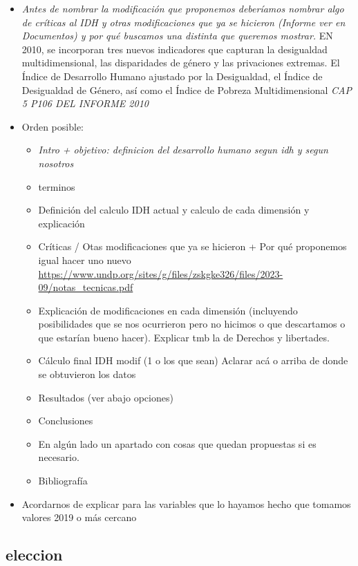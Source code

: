 \documentclass[
  10pt,
]{article}
\providecommand{\tightlist}{%
  \setlength{\itemsep}{0pt}\setlength{\parskip}{0pt}}
\begin{document}
\begin{itemize}
\item
  \emph{Antes de nombrar la modificación que proponemos deberíamos
  nombrar algo de críticas al IDH y otras modificaciones que ya se
  hicieron (Informe ver en Documentos) y por qué buscamos una distinta
  que queremos mostrar.} EN 2010, se incorporan tres nuevos indicadores
  que capturan la desigualdad multidimensional, las disparidades de
  género y las privaciones extremas. El Índice de Desarrollo Humano
  ajustado por la Desigualdad, el Índice de Desigualdad de Género, así
  como el Índice de Pobreza Multidimensional \emph{CAP 5 P106 DEL
  INFORME 2010}
\item
  Orden posible:

  \begin{itemize}
  \tightlist
  \item
    \emph{Intro + objetivo: definicion del desarrollo humano segun idh y
    segun nosotros}
  \item
    terminos
  \item
    Definición del calculo IDH actual y calculo de cada dimensión y
    explicación
  \item
    Críticas / Otas modificaciones que ya se hicieron + Por qué
    proponemos igual hacer uno nuevo
    \url{https://www.undp.org/sites/g/files/zskgke326/files/2023-09/notas_tecnicas.pdf}
  \item
    Explicación de modificaciones en cada dimensión (incluyendo
    posibilidades que se nos ocurrieron pero no hicimos o que
    descartamos o que estarían bueno hacer). Explicar tmb la de Derechos
    y libertades.
  \item
    Cálculo final IDH modif (1 o los que sean) Aclarar acá o arriba de
    donde se obtuvieron los datos
  \item
    Resultados (ver abajo opciones)
  \item
    Conclusiones
  \item
    En algún lado un apartado con cosas que quedan propuestas si es
    necesario.
  \item
    Bibliografía
  \end{itemize}
\item
  Acordarnos de explicar para las variables que lo hayamos hecho que
  tomamos valores 2019 o más cercano
\end{itemize}

\hypertarget{eleccion}{%
\subsection{eleccion}\label{eleccion}}
\end{document}
